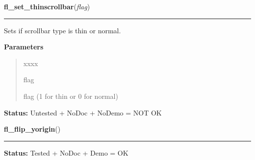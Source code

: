 \hspace{.8\funcindent}\begin{boxedminipage}{\funcwidth}

    \raggedright \textbf{fl\_set\_thinscrollbar}(\textit{flag})

    \vspace{-1.5ex}

    \rule{\textwidth}{0.5\fboxrule}
\setlength{\parskip}{2ex}
    Sets if scrollbar type is thin or normal.

\setlength{\parskip}{1ex}
      \textbf{Parameters}
      \vspace{-1ex}

      \begin{quote}
        \begin{Ventry}{xxxx}

          \item[flag]

          flag (1 for thin or 0 for normal)

        \end{Ventry}

      \end{quote}

\textbf{Status:} Untested + NoDoc + NoDemo = NOT OK



    \end{boxedminipage}

    \label{xformslib:library:fl_flip_yorigin}

    \vspace{0.5ex}

\hspace{.8\funcindent}\begin{boxedminipage}{\funcwidth}

    \raggedright \textbf{fl\_flip\_yorigin}()

    \vspace{-1.5ex}

    \rule{\textwidth}{0.5\fboxrule}
\setlength{\parskip}{2ex}
\setlength{\parskip}{1ex}
\textbf{Status:} Tested + NoDoc + Demo = OK



    \end{boxedminipage}

    \label{xformslib:library:fl_get_coordunit}

